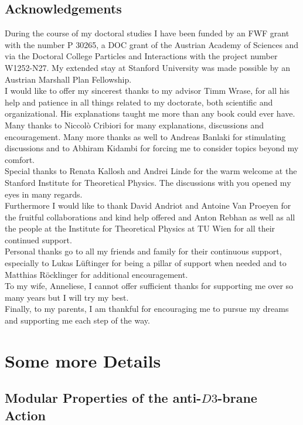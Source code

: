 \documentclass[a4paper,12pt,twoside,openright]{report}
\begin{document}
\newpage
\section*{Acknowledgements}
During the course of my doctoral studies I have been funded by an FWF grant with the number P 30265, a DOC grant of the Austrian Academy of Sciences and via the Doctoral College Particles  and Interactions with the project number W1252-N27. My extended stay at Stanford University was made possible by an Austrian Marshall Plan Fellowship.\\
I would like to offer my sincerest thanks to my advisor Timm Wrase, for all his help and patience in all things related to my doctorate, both scientific and organizational. His explanations taught me more than any book could ever have.\\
Many thanks to Niccol\`o Cribiori for many explanations, discussions and encouragement. Many more thanks as well to Andreas Banlaki for stimulating discussions and to Abhiram Kidambi for forcing me to consider topics beyond my comfort.\\
Special thanks to Renata Kallosh and Andrei Linde for the warm welcome at the Stanford Institute for Theoretical Physics. The discussions with you opened my eyes in many regards.\\
Furthermore I would like to thank David Andriot %
and Antoine Van Proeyen for the fruitful collaborations and kind help offered and Anton Rebhan as well as all the people at the Institute  for Theoretical Physics at TU Wien for all their continued support.\\
Personal thanks go to all my friends and family for their continuous support, especially to Lukas Lüftinger for being a pillar of support when needed and to Matthias Röcklinger for additional encouragement.\\
To my wife, Anneliese, I cannot offer sufficient thanks for supporting me over so many years but I will try my best.\\
Finally, to my parents, I am thankful for encouraging me to pursue my dreams and supporting me each step of the way.


\appendix
\chapter{Some more Details}

\section{Modular Properties of the anti-$D3$-brane Action}
\label{app:modinv}
\end{document}
